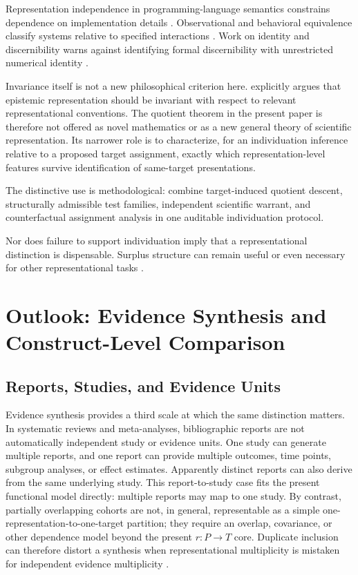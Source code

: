 \documentclass[12pt]{article}
\begin{document}
Representation independence in programming-language semantics constrains dependence on implementation details \citep{Mitchell1986RepresentationIndependence}. Observational and behavioral equivalence classify systems relative to specified interactions \citep{HennessyMilner1985,Rutten2000UniversalCoalgebra}. Work on identity and discernibility warns against identifying formal discernibility with unrestricted numerical identity \citep{LadymanLinneboPettigrew2012,DieksVersteegh2008}.

Invariance itself is not a new philosophical criterion here. \citet{Liu2015Invariance} explicitly argues that epistemic representation should be invariant with respect to relevant representational conventions. The quotient theorem in the present paper is therefore not offered as novel mathematics or as a new general theory of scientific representation. Its narrower role is to characterize, for an individuation inference relative to a proposed target assignment, exactly which representation-level features survive identification of same-target presentations.

The distinctive use is methodological: combine target-induced quotient descent, structurally admissible test families, independent scientific warrant, and counterfactual assignment analysis in one auditable individuation protocol.

Nor does failure to support individuation imply that a representational distinction is dispensable. Surplus structure can remain useful or even necessary for other representational tasks \citep{NguyenTehWells2020Surplus}.

\section{Outlook: Evidence Synthesis and Construct-Level Comparison}

\subsection{Reports, Studies, and Evidence Units}

Evidence synthesis provides a third scale at which the same distinction matters. In systematic reviews and meta-analyses, bibliographic reports are not automatically independent study or evidence units. One study can generate multiple reports, and one report can provide multiple outcomes, time points, subgroup analyses, or effect estimates. Apparently distinct reports can also derive from the same underlying study. This report-to-study case fits the present functional model directly: multiple reports may map to one study. By contrast, partially overlapping cohorts are not, in general, representable as a simple one-representation-to-one-target partition; they require an overlap, covariance, or other dependence model beyond the present \(r:P\to T\) core. Duplicate inclusion can therefore distort a synthesis when representational multiplicity is mistaken for independent evidence multiplicity \citep{Tramer1997DuplicateMetaAnalysis,VonElm2004DuplicatePublication}.
\end{document}

